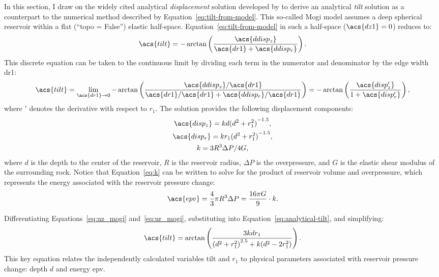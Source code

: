 In this section, I draw on the widely cited analytical \emph{displacement} solution developed by \textcite{mogi_relations_1958} to derive an analytical \emph{tilt} solution as a counterpart to the numerical method described by Equation~\eqref{eq:tilt-from-model}. This so-called Mogi model assumes a deep spherical reservoir within a flat (``topo = False'') elastic half-space. Equation~\eqref{eq:tilt-from-model} in such a half-space ($\acs{dz1} = 0$) reduces to:
\begin{equation}
    \acs{tilt} = 
    -\arctan\left(\dfrac{\acs{ddisp_z}}{\acs{dr1}+\acs{ddisp_r}}\right).\label{eq:tilt-from-flat-model}
\end{equation}
This discrete equation can be taken to the continuous limit by dividing each term in the numerator and denominator by the edge width \acs{dr1}:
\begin{equation}
\acs{tilt}
    = \lim_{\acs{dr1}\to0} 
    -\arctan\left(\dfrac{\acs{ddisp_z}/\acs{dr1}}{\acs{dr1}/\acs{dr1}
    + \acs{ddisp_r}/\acs{dr1}}\right) = 
    -\arctan\left(\dfrac{\acs{disp_z'}}{1+\acs{disp_r'}}\right),\label{eq:analytical-tilt}
\end{equation}
where $'$ denotes the derivative with respect to $r_1$. The \textcite{mogi_relations_1958} solution provides the following displacement components:
\begin{gather}
    \acs{disp_z} = kd{(d^2+r_1^2)}^{-1.5},\label{eq:uz_mogi}\\
    \acs{disp_r} = kr_1{(d^2+r_1^2)}^{-1.5},\label{eq:ur_mogi}\\
    k = {3R^3\Delta P}/{4G},\label{eq:k}
\end{gather}
where $d$ is the depth to the center of the reservoir, $R$ is the reservoir radius, $\Delta P$ is the overpressure, and $G$ is the elastic shear modulus of the surrounding rock. Notice that Equation~\eqref{eq:k} can be written to solve for the product of reservoir volume and overpressure, which represents the energy associated with the reservoir pressure change:
\begin{equation}
    \acs{epv} = \frac{4}{3}\pi R^3\Delta P=\frac{16\pi G}{9} \cdot k.\label{eq:epv}
\end{equation}

Differentiating Equations~\eqref{eq:uz_mogi} and~\eqref{eq:ur_mogi}, substituting into Equation~\eqref{eq:analytical-tilt}, and simplifying:
\begin{equation}
    \acs{tilt} = \arctan\left(\frac{3kdr_1}{{(d^2+r_1^2)}^{2.5}+k(d^2-2r_1^2)}\right).\label{eq:mogi-tilt}
\end{equation}
This key equation relates the independently calculated variables \acs{tilt} and $r_1$ to physical parameters associated with reservoir pressure change: depth $d$ and energy \acs{epv}.

